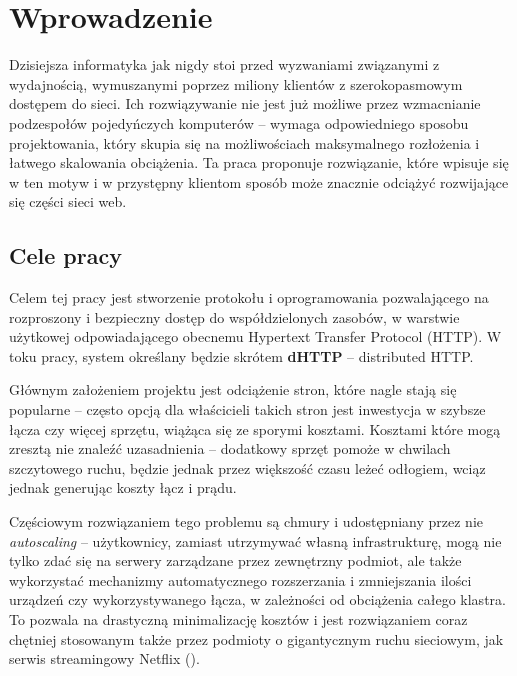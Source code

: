 \chapter{Wprowadzenie}
\label{cha:wprowadzenie}

Dzisiejsza informatyka jak nigdy stoi przed wyzwaniami związanymi z wydajnością, wymuszanymi poprzez miliony klientów z szerokopasmowym dostępem do sieci. Ich rozwiązywanie nie jest już możliwe przez wzmacnianie podzespołów pojedyńczych komputerów -- wymaga odpowiedniego sposobu projektowania, który skupia się na możliwościach maksymalnego rozłożenia i łatwego skalowania obciążenia. Ta praca proponuje rozwiązanie, które wpisuje się w ten motyw i w przystępny klientom sposób może znacznie odciążyć rozwijające się części sieci web.

\section{Cele pracy}
\label{sec:celePracy}


Celem tej pracy jest stworzenie protokołu i oprogramowania pozwalającego na rozproszony i bezpieczny dostęp do współdzielonych zasobów, w warstwie użytkowej odpowiadającego obecnemu Hypertext Transfer Protocol (HTTP). W toku pracy, system określany będzie skrótem \textbf{dHTTP} -- distributed HTTP.


Głównym założeniem projektu jest odciążenie stron, które nagle stają się popularne -- często opcją dla właścicieli takich stron jest inwestycja w szybsze łącza czy więcej sprzętu, wiążąca się ze sporymi kosztami. Kosztami które mogą zresztą nie znaleźć uzasadnienia -- dodatkowy sprzęt pomoże w chwilach szczytowego ruchu, będzie jednak przez większość czasu leżeć odłogiem, wciąz jednak generując koszty łącz i prądu.

Częściowym rozwiązaniem tego problemu są chmury i udostępniany przez nie {\em autoscaling} -- użytkownicy, zamiast utrzymywać własną infrastrukturę, mogą nie tylko zdać się na serwery zarządzane przez zewnętrzny podmiot, ale także wykorzystać mechanizmy automatycznego rozszerzania i zmniejszania ilości urządzeń czy wykorzystywanego łącza, w zależności od obciążenia całego klastra. To pozwala na drastyczną minimalizację kosztów i jest rozwiązaniem coraz chętniej stosowanym także przez podmioty o gigantycznym ruchu sieciowym, jak serwis streamingowy Netflix (\cite{AWSAs}).

